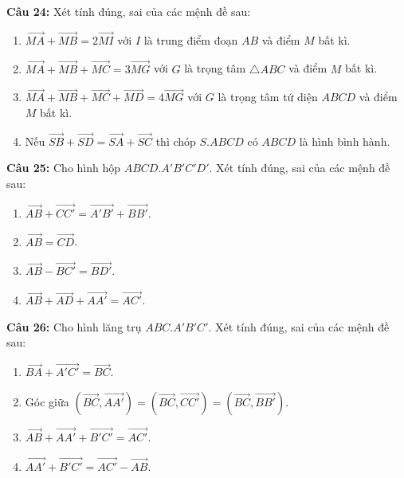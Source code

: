 \documentclass[12pt]{article}
\begin{document}
	\vspace{0.2cm}
	\noindent \textbf{Câu 24:} Xét tính đúng, sai của các mệnh đề sau:
	\begin{enumerate}[label=\alph*)]
		\item $\overrightarrow{MA} + \overrightarrow{MB} = 2\overrightarrow{MI}$ với $I$ là trung điểm đoạn $AB$ và điểm $M$ bất kì.
		\item $\overrightarrow{MA} + \overrightarrow{MB} + \overrightarrow{MC} = 3\overrightarrow{MG}$ với $G$ là trọng tâm $\triangle ABC$ và điểm $M$ bất kì.
		\item $\overrightarrow{MA} + \overrightarrow{MB} + \overrightarrow{MC} + \overrightarrow{MD} = 4\overrightarrow{MG}$ với $G$ là trọng tâm tứ diện $ABCD$ và điểm $M$ bất kì.
		\item Nếu $\overrightarrow{SB} + \overrightarrow{SD} = \overrightarrow{SA} + \overrightarrow{SC}$ thì chóp $S.ABCD$ có $ABCD$ là hình bình hành.
	\end{enumerate}
	
	\vspace{0.2cm}
	\noindent \textbf{Câu 25:} Cho hình hộp $ABCD.A'B'C'D'$. Xét tính đúng, sai của các mệnh đề sau:
	\begin{enumerate}[label=\alph*)]
		\item $\overrightarrow{AB} + \overrightarrow{CC'} = \overrightarrow{A'B'} + \overrightarrow{BB'}$.
		\item $\overrightarrow{AB} = \overrightarrow{CD}$.
		\item $\overrightarrow{AB} - \overrightarrow{BC'} = \overrightarrow{BD'}$.
		\item $\overrightarrow{AB} + \overrightarrow{AD} + \overrightarrow{AA'} = \overrightarrow{AC'}$.
	\end{enumerate}
	
	\vspace{0.2cm}
	\noindent \textbf{Câu 26:} Cho hình lăng trụ $ABC.A'B'C'$. Xét tính đúng, sai của các mệnh đề sau:
	\begin{enumerate}[label=\alph*)]
		\item $\overrightarrow{BA} + \overrightarrow{A'C'} = \overrightarrow{BC}$.
		\item Góc giữa $(\overrightarrow{BC}, \overrightarrow{AA'}) = (\overrightarrow{BC}, \overrightarrow{CC'}) = (\overrightarrow{BC}, \overrightarrow{BB'})$.
		\item $\overrightarrow{AB} + \overrightarrow{AA'} + \overrightarrow{B'C'} = \overrightarrow{AC'}$.
		\item $\overrightarrow{AA'} + \overrightarrow{B'C'} = \overrightarrow{AC'} - \overrightarrow{AB}$.
	\end{enumerate}
	
\end{document}
